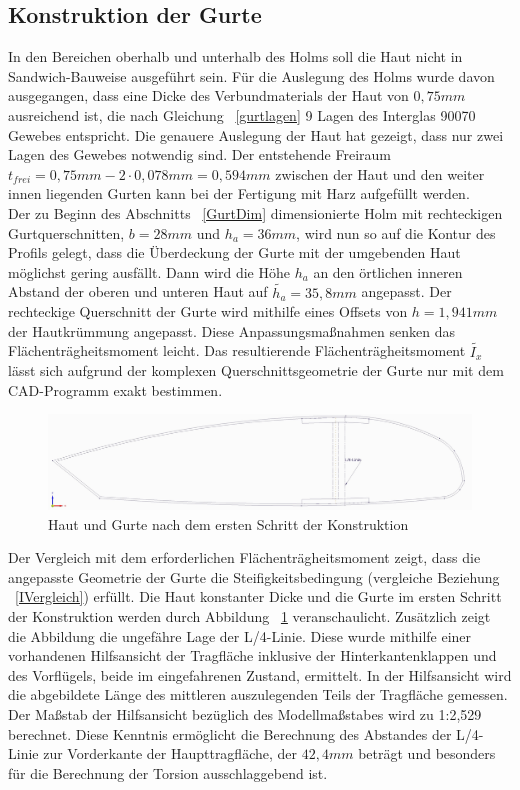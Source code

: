 \subsection{Konstruktion der Gurte}
\noindent In den Bereichen oberhalb und unterhalb des Holms soll die Haut nicht in Sandwich-Bauweise ausgeführt sein. Für die Auslegung des Holms wurde davon ausgegangen, dass eine Dicke des Verbundmaterials der Haut von $ 0,75mm $ ausreichend ist, die nach Gleichung ~\ref{gurtlagen} 9 Lagen des Interglas 90070 Gewebes entspricht. Die genauere Auslegung der Haut hat gezeigt, dass nur zwei Lagen des Gewebes notwendig sind. Der entstehende Freiraum $t_{frei}= 0,75mm-2\cdot 0,078mm=0,594mm $ zwischen der Haut und den weiter innen liegenden Gurten kann bei der Fertigung mit Harz aufgefüllt werden.\\
\noindent Der zu Beginn des Abschnitts ~\ref{GurtDim} dimensionierte Holm mit rechteckigen Gurtquerschnitten, $ b=28mm $ und $ h_{a}=36mm $, wird nun so auf die Kontur des Profils gelegt, dass die Überdeckung der Gurte mit der umgebenden Haut möglichst gering ausfällt. Dann wird die Höhe $ h_{a} $ an den örtlichen inneren Abstand der oberen und unteren Haut auf $\tilde{h_{a}}=35,8mm $ angepasst. Der rechteckige Querschnitt der Gurte wird mithilfe eines Offsets von $ {h}=1,941mm $ der Hautkrümmung angepasst. Diese Anpassungsmaßnahmen senken das Flächenträgheitsmoment leicht. Das resultierende Flächenträgheitsmoment $ \tilde{I_{x}} $ lässt sich aufgrund der komplexen Querschnittsgeometrie der Gurte nur mit dem CAD-Programm exakt bestimmen. 
\begin{figure}[h]
	\includegraphics[width=1.0\textwidth]{Bilder/Kontur.jpg}
	\caption{Haut und Gurte nach dem ersten Schritt der Konstruktion}
	\label{fig: Kontur}
\end{figure} 
Der Vergleich mit dem erforderlichen Flächenträgheitsmoment zeigt, dass die angepasste Geometrie der Gurte die Steifigkeitsbedingung (vergleiche Beziehung ~\ref{IVergleich}) erfüllt. Die Haut konstanter Dicke und die Gurte im ersten Schritt der Konstruktion werden durch Abbildung ~\ref{fig: Kontur} veranschaulicht. Zusätzlich zeigt die Abbildung die ungefähre Lage der L/4-Linie. Diese wurde mithilfe einer vorhandenen Hilfsansicht der Tragfläche inklusive der Hinterkantenklappen und des Vorflügels, beide im eingefahrenen Zustand, ermittelt. In der Hilfsansicht wird die abgebildete Länge des mittleren auszulegenden Teils der Tragfläche gemessen. Der Maßstab der Hilfsansicht bezüglich des Modellmaßstabes wird zu 1:2,529 berechnet. Diese Kenntnis ermöglicht die Berechnung des Abstandes der L/4-Linie zur Vorderkante der Haupttragfläche, der $ 42,4mm $ beträgt und besonders für die Berechnung der Torsion ausschlaggebend ist.\\

